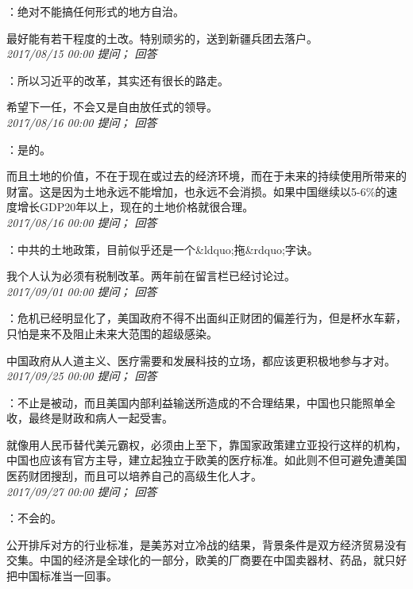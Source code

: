 \documentclass[twocolumn]{ctexart}
\begin{document}
：绝对不能搞任何形式的地方自治。

最好能有若干程度的土改。特别顽劣的，送到新疆兵团去落户。\\

\textit{\hfill\noindent\small 2017/08/15 00:00 提问； 回答}

：所以习近平的改革，其实还有很长的路走。

希望下一任，不会又是自由放任式的领导。\\

\textit{\hfill\noindent\small 2017/08/16 00:00 提问； 回答}

：是的。

而且土地的价值，不在于现在或过去的经济环境，而在于未来的持续使用所带来的财富。这是因为土地永远不能增加，也永远不会消损。如果中国继续以5-6\%的速度增长GDP20年以上，现在的土地价格就很合理。\\

\textit{\hfill\noindent\small 2017/08/16 00:00 提问； 回答}

：中共的土地政策，目前似乎还是一个\&ldquo;拖\&rdquo;字诀。

我个人认为必须有税制改革。两年前在留言栏已经讨论过。\\

\textit{\hfill\noindent\small 2017/09/01 00:00 提问； 回答}

：危机已经明显化了，美国政府不得不出面纠正财团的偏差行为，但是杯水车薪，只怕是来不及阻止未来大范围的超级感染。

中国政府从人道主义、医疗需要和发展科技的立场，都应该更积极地参与才对。\\

\textit{\hfill\noindent\small 2017/09/25 00:00 提问； 回答}

：不止是被动，而且美国内部利益输送所造成的不合理结果，中国也只能照单全收，最终是财政和病人一起受害。

就像用人民币替代美元霸权，必须由上至下，靠国家政策建立亚投行这样的机构，中国也应该有官方主导，建立起独立于欧美的医疗标准。如此则不但可避免遭美国医药财团搜刮，而且可以培养自己的高级生化人才。\\

\textit{\hfill\noindent\small 2017/09/27 00:00 提问； 回答}

：不会的。

公开排斥对方的行业标准，是美苏对立冷战的结果，背景条件是双方经济贸易没有交集。中国的经济是全球化的一部分，欧美的厂商要在中国卖器材、药品，就只好把中国标准当一回事。
\end{document}
